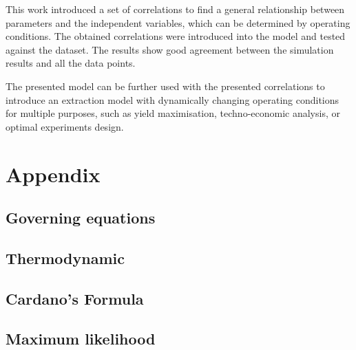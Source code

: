 \documentclass[a4paper,fleqn]{cas-dc}
\begin{document}
This work introduced a set of correlations to find a general relationship between parameters and the independent variables, which can be determined by operating conditions. The obtained correlations were introduced into the model and tested against the dataset. The results show good agreement between the simulation results and all the data points.

The presented model can be further used with the presented correlations to introduce an extraction model with dynamically changing operating conditions for multiple purposes, such as yield maximisation, techno-economic analysis, or optimal experiments design.

%



\clearpage \appendix \label{appendix}
\section{Appendix} 

\subsection{Governing equations}


\subsection{Thermodynamic}
 \label{CH: EOS}


\subsection{Cardano's Formula} \label{CH: Cardano}


%

\subsection{Maximum likelihood} \label{CH: ML}

\end{document}
